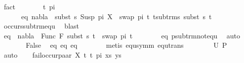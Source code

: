 \begin{isabellebody}
\ fact\isanewline
\ \ \ \ \isamarkupfalse%
\ \isamarkupfalse%
\ t{\isacharprime}{\kern0pt}\ pi{\isacharprime}{\kern0pt}\ \ \ \isanewline
\ \ \ \ \ \ eq{}{\isacharcolon}{\kern0pt}\ {\isachardoublequoteopen}nabla\ {\isasymturnstile}\ subst\ s\ {\isacharparenleft}{\kern0pt}Susp\ pi\ X{\isacharparenright}{\kern0pt}\ {\isasymapprox}\ swap\ pi{\isacharprime}{\kern0pt}\ t{\isacharprime}{\kern0pt}{\isachardoublequoteclose}\ {\isachardoublequoteopen}t{\isacharprime}{\kern0pt}{\isasymin}sub{\isacharunderscore}{\kern0pt}trms\ {\isacharparenleft}{\kern0pt}subst\ s\ t{\isacharparenright}{\kern0pt}{\isachardoublequoteclose}\isanewline
\ \ \ \ \ \ \isamarkupfalse%
\ occurs{\isacharunderscore}{\kern0pt}sub{\isacharunderscore}{\kern0pt}trm{\isacharunderscore}{\kern0pt}equ\ \isamarkupfalse%
\ blast\isanewline
\ \ \ \ \isamarkupfalse%
\ \ \isanewline
\ \ \ \ \isamarkupfalse%
\ eq{}{\isacharcolon}{\kern0pt}\ {\isachardoublequoteopen}{\isasymnot}\ nabla\ {\isasymturnstile}\ {\isacharparenleft}{\kern0pt}Func\ F\ {\isacharparenleft}{\kern0pt}subst\ s\ t{\isacharparenright}{\kern0pt}{\isacharparenright}{\kern0pt}\ {\isasymapprox}\ swap\ pi{\isacharprime}{\kern0pt}\ t{\isacharprime}{\kern0pt}{\isachardoublequoteclose}\isanewline
\ \ \ \ \ \ \isamarkupfalse%
\ eq{}\ psub{\isacharunderscore}{\kern0pt}trm{\isacharunderscore}{\kern0pt}not{\isacharunderscore}{\kern0pt}equ\ \isamarkupfalse%
\ auto\isanewline
\ \ \ \ \isamarkupfalse%
\ \isamarkupfalse%
\ {\isachardoublequoteopen}False{\isachardoublequoteclose}\ \isamarkupfalse%
\ eq{}\ eq{}\ eq{}\isanewline
\ \ \ \ \ \ \isamarkupfalse%
\ {\isacharparenleft}{\kern0pt}metis\ equ{\isacharunderscore}{\kern0pt}symm\ equ{\isacharunderscore}{\kern0pt}trans{\isacharparenright}{\kern0pt}\isanewline
\ \ \isakeywordONE{{\isacharbraceright}{\kern0pt}}\isamarkupfalse%
\isanewline
\ \ \isamarkupfalse%
\ \isamarkupfalse%
\ {\isachardoublequoteopen}U\ {\isacharquery}{\kern0pt}P\ {\isacharequal}{\kern0pt}\ {\isacharbraceleft}{\kern0pt}{\isacharbraceright}{\kern0pt}{\isachardoublequoteclose}\ \isamarkupfalse%
\ auto\isanewline
{}\isamarkupfalse%
\isanewline
\ \ \isamarkupfalse%
\ {\isacharparenleft}{\kern0pt}fail{\isacharunderscore}{\kern0pt}occur{\isacharunderscore}{\kern0pt}paar\ X\ t{}\ t{}\ pi\ xs\ ys{\isacharparenright}{\kern0pt}\isanewline

\end{isabellebody}
